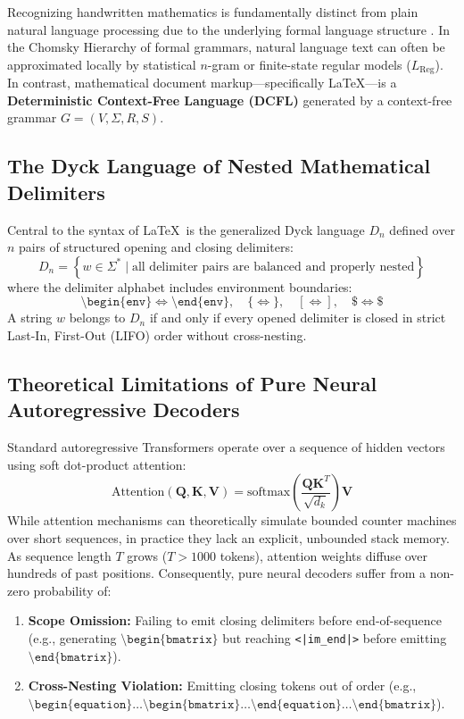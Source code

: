Recognizing handwritten mathematics is fundamentally distinct from plain natural language processing due to the underlying formal language structure \cite{hopcroft2001introduction}. In the Chomsky Hierarchy of formal grammars, natural language text can often be approximated locally by statistical $n$-gram or finite-state regular models ($L_{\text{Reg}}$). In contrast, mathematical document markup---specifically \LaTeX---is a \textbf{Deterministic Context-Free Language (DCFL)} generated by a context-free grammar $G = (V, \Sigma, R, S)$.

\subsection{The Dyck Language of Nested Mathematical Delimiters}
Central to the syntax of \LaTeX\ is the generalized Dyck language $D_n$ defined over $n$ pairs of structured opening and closing delimiters:
\begin{equation}
\label{eq:dyck_language}
D_n = \left\{ w \in \Sigma^* \mid \text{all delimiter pairs are balanced and properly nested} \right\}
\end{equation}
where the delimiter alphabet includes environment boundaries:
\begin{equation}
\texttt{\textbackslash begin\{env\}} \iff \texttt{\textbackslash end\{env\}}, \quad \{ \iff \}, \quad [ \iff ], \quad \$ \iff \$
\end{equation}
A string $w$ belongs to $D_n$ if and only if every opened delimiter is closed in strict Last-In, First-Out (LIFO) order without cross-nesting.

\subsection{Theoretical Limitations of Pure Neural Autoregressive Decoders}
Standard autoregressive Transformers operate over a sequence of hidden vectors using soft dot-product attention:
\begin{equation}
\text{Attention}(\mathbf{Q}, \mathbf{K}, \mathbf{V}) = \text{softmax}\left( \frac{\mathbf{Q}\mathbf{K}^T}{\sqrt{d_k}} \right) \mathbf{V}
\end{equation}
While attention mechanisms can theoretically simulate bounded counter machines over short sequences, in practice they lack an explicit, unbounded stack memory. As sequence length $T$ grows ($T > 1000$ tokens), attention weights diffuse over hundreds of past positions. Consequently, pure neural decoders suffer from a non-zero probability of:
\begin{enumerate}
    \item \textbf{Scope Omission:} Failing to emit closing delimiters before end-of-sequence (e.g., generating $\texttt{\textbackslash begin\{bmatrix\}}$ but reaching \texttt{<|im\_end|>} before emitting $\texttt{\textbackslash end\{bmatrix\}}$).
    \item \textbf{Cross-Nesting Violation:} Emitting closing tokens out of order (e.g., $\texttt{\textbackslash begin\{equation\}} \dots \texttt{\textbackslash begin\{bmatrix\}} \dots \texttt{\textbackslash end\{equation\}} \dots \texttt{\textbackslash end\{bmatrix\}}$).
\end{enumerate}

